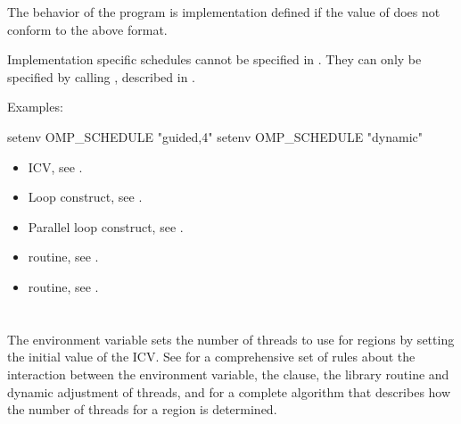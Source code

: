 The behavior of the program is implementation defined if the value of  
does not conform to the above format.

Implementation specific schedules cannot be specified in . They can 
only be specified by calling , described in . 

Examples:

\begin{boxedcode}
setenv OMP\_SCHEDULE "guided,4" 
setenv OMP\_SCHEDULE "dynamic"
\end{boxedcode}

\crossreferences
\begin{itemize}
\item {} ICV, see .

\item Loop construct, see .

\item Parallel loop construct, see .

\item {} routine, see .

\item {} routine, see .
\end{itemize}









\section{}
\label{sec:OMP_NUM_THREADS}
The  environment variable sets the number of threads to use for 
 regions by setting the initial value of the  ICV. See 
 for a comprehensive set of rules about the interaction between the 
 environment variable, the  clause, the 
 library routine and dynamic adjustment of threads, and 
for a complete algorithm that describes how the number of 
threads for a  region is determined.

